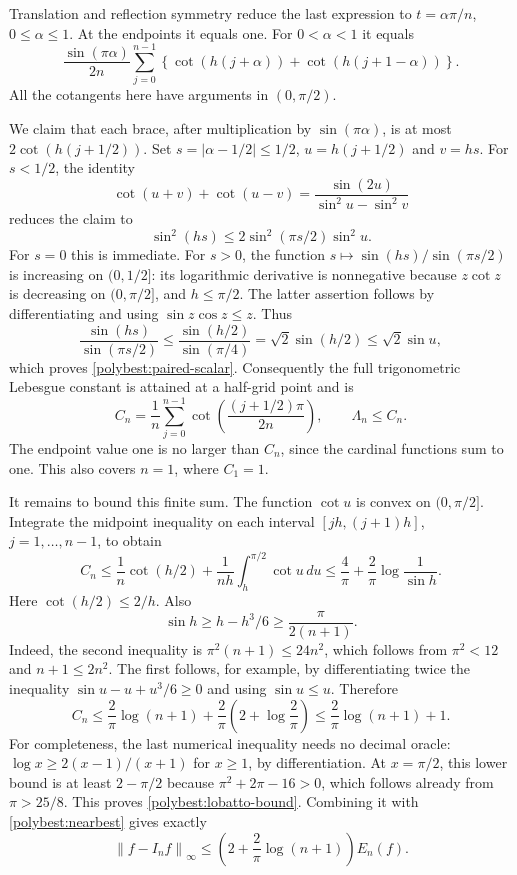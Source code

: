 \documentclass[11pt]{article}
\newcommand{\norm}[1]{\left\lVert #1\right\rVert}
\theoremstyle{remark}
\numberwithin{equation}{section}
\begin{document}
Translation and reflection symmetry reduce the last expression to
$t=\alpha\pi/n$, $0\le\alpha\le1$.  At the endpoints it equals one.
For $0<\alpha<1$ it equals
\begin{equation}\label{polybest:cot-pair-sum}
 \frac{\sin(\pi\alpha)}{2n}
 \sum_{j=0}^{n-1}\left\{
  \cot(h(j+\alpha))+\cot(h(j+1-\alpha))\right\}.
\end{equation}
All the cotangents here have arguments in $(0,\pi/2)$.

We claim that each brace, after multiplication by $\sin(\pi\alpha)$,
is at most $2\cot(h(j+1/2))$.  Set $s=|\alpha-1/2|\le1/2$,
$u=h(j+1/2)$ and $v=hs$.  For $s<1/2$, the identity
\[
 \cot(u+v)+\cot(u-v)
 =\frac{\sin(2u)}{\sin^2u-\sin^2v}
\]
reduces the claim to
\begin{equation}\label{polybest:paired-scalar}
 \sin^2(hs)\le2\sin^2(\pi s/2)\sin^2u.
\end{equation}
For $s=0$ this is immediate.  For $s>0$, the function
$s\mapsto\sin(hs)/\sin(\pi s/2)$ is increasing on $(0,1/2]$:
its logarithmic derivative is nonnegative because $z\cot z$ is
decreasing on $(0,\pi/2]$, and $h\le\pi/2$.
The latter assertion follows by differentiating and using
$\sin z\cos z\le z$.
Thus
\[
 \frac{\sin(hs)}{\sin(\pi s/2)}
 \le \frac{\sin(h/2)}{\sin(\pi/4)}
 =\sqrt2\sin(h/2)\le\sqrt2\sin u,
\]
which proves \eqref{polybest:paired-scalar}.  Consequently the full
trigonometric Lebesgue constant is attained at a half-grid point and is
\begin{equation}\label{polybest:cot-exact}
 C_n=\frac1n\sum_{j=0}^{n-1}\cot\left(\frac{(j+1/2)\pi}{2n}\right),
 \qquad \Lambda_n\le C_n.
\end{equation}
The endpoint value one is no larger than $C_n$, since the cardinal
functions sum to one.  This also covers $n=1$, where $C_1=1$.

It remains to bound this finite sum.  The function $\cot u$ is convex
on $(0,\pi/2]$.  Integrate the midpoint inequality on each interval
$[jh,(j+1)h]$, $j=1,\ldots,n-1$, to obtain
\[
 C_n\le\frac1n\cot(h/2)+\frac1{nh}\int_h^{\pi/2}\cot u\,du
 \le\frac4\pi+\frac2\pi\log\frac1{\sin h}.
\]
Here $\cot(h/2)\le2/h$.  Also
\[
 \sin h\ge h-h^3/6\ge\frac{\pi}{2(n+1)}.
\]
Indeed, the second inequality is $\pi^2(n+1)\le24n^2$, which follows
from $\pi^2<12$ and $n+1\le2n^2$.  The first follows, for example,
by differentiating twice the inequality
$\sin u-u+u^3/6\ge0$ and using $\sin u\le u$.
Therefore
\[
 C_n\le\frac2\pi\log(n+1)+\frac2\pi\left(2+\log\frac2\pi\right)
       \le\frac2\pi\log(n+1)+1.
\]
For completeness, the last numerical inequality needs no decimal
oracle: $\log x\ge2(x-1)/(x+1)$ for $x\ge1$, by differentiation.
At $x=\pi/2$, this lower bound is at least $2-\pi/2$ because
$\pi^2+2\pi-16>0$, which follows already from $\pi>25/8$.
This proves \eqref{polybest:lobatto-bound}.  Combining it with
\eqref{polybest:nearbest} gives exactly
\[
 \norm{f-I_nf}_\infty\le
 \left(2+\frac2\pi\log(n+1)\right)E_n(f).
\]
\end{document}
